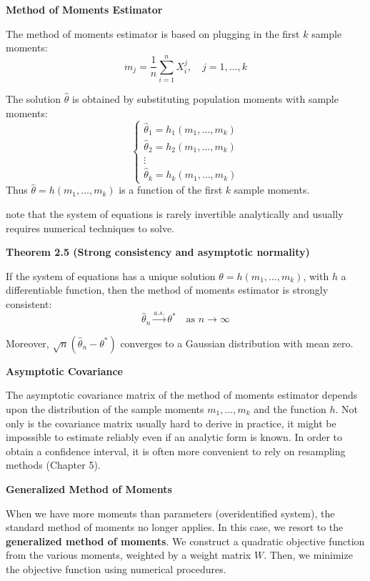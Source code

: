 \documentclass[12pt,a4paper]{article}
\begin{document}
\textbf{Method of Moments Estimator}

The method of moments estimator is based on plugging in the first $k$ sample moments:
\[
m_j = \frac{1}{n} \sum_{i=1}^{n} X_i^j, \quad j = 1, \ldots, k
\]

The solution $\hat{\theta}$ is obtained by substituting population moments with sample moments:
\[
\begin{cases}
\hat{\theta}_1 = h_1(m_1, \ldots, m_k) \\
\hat{\theta}_2 = h_2(m_1, \ldots, m_k) \\
\vdots \\
\hat{\theta}_k = h_k(m_1, \ldots, m_k)
\end{cases}
\]
Thus $\hat{\theta} = h(m_1, \ldots, m_k)$ is a function of the first $k$ sample moments.

note that the system of equations is rarely invertible analytically and usually requires numerical techniques to solve.

\vspace{0.5em}

\textbf{Theorem 2.5 (Strong consistency and asymptotic normality)}

If the system of equations has a unique solution $\theta = h(m_1, \ldots, m_k)$, with $h$ a differentiable function, then the method of moments estimator is strongly consistent:
\[
\hat{\theta}_n \xrightarrow{a.s.} \theta^* \quad \text{as } n \to \infty
\]

Moreover, $\sqrt{n}(\hat{\theta}_n - \theta^*)$ converges to a Gaussian distribution with mean zero.

\textbf{Asymptotic Covariance}

The asymptotic covariance matrix of the method of moments estimator depends upon the distribution of the sample moments $m_1, \ldots, m_k$ and the function $h$. Not only is the covariance matrix usually hard to derive in practice, it might be impossible to estimate reliably even if an analytic form is known. In order to obtain a confidence interval, it is often more convenient to rely on resampling methods (Chapter 5).

\vspace{0.5em}

\textbf{Generalized Method of Moments}

When we have more moments than parameters (overidentified system), the standard method of moments no longer applies. In this case, we resort to the \textbf{generalized method of moments}. We construct a quadratic objective function from the various moments, weighted by a weight matrix $W$. Then, we minimize the objective function using numerical procedures.
\end{document}

